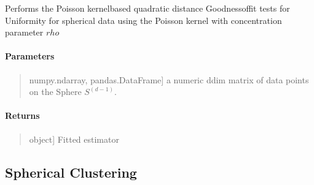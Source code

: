 \documentclass[letterpaper,10pt,english,openany,oneside]{sphinxmanual}
\begin{document}
\begin{fulllineitems}
\label{\detokenize{api_reference/generated/QuadratiK.poisson_kernel_test.PoissonKernelTest:QuadratiK.poisson_kernel_test.PoissonKernelTest.test}}
\pysigstartsignatures
{}
\pysigstopsignatures
\sphinxAtStartPar
Performs the Poisson kernel\sphinxhyphen{}based quadratic distance Goodness\sphinxhyphen{}of\sphinxhyphen{}fit tests for
Uniformity for spherical data using the Poisson kernel with concentration parameter \(rho\)


\paragraph{Parameters}
\label{\detokenize{api_reference/generated/QuadratiK.poisson_kernel_test.PoissonKernelTest:id3}}\begin{quote}
\begin{description}
\sphinxlineitem{x}{[}numpy.ndarray, pandas.DataFrame{]}
\sphinxAtStartPar
a numeric d\sphinxhyphen{}dim matrix of data points on the Sphere \(S^{(d-1)}\).

\end{description}
\end{quote}


\paragraph{Returns}
\label{\detokenize{api_reference/generated/QuadratiK.poisson_kernel_test.PoissonKernelTest:id4}}\begin{quote}
\begin{description}
\sphinxlineitem{self}{[}object{]}
\sphinxAtStartPar
Fitted estimator

\end{description}
\end{quote}

\end{fulllineitems}




\subsection{Spherical Clustering}
\label{\detokenize{api_reference/index:spherical-clustering}}\label{\detokenize{api_reference/index:module-QuadratiK.spherical_clustering}}
\end{document}
